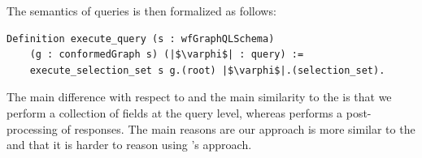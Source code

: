 The semantics of queries is then formalized as follows:
\begin{verbatim}
Definition execute_query (s : wfGraphQLSchema)
    (g : conformedGraph s) (|$\varphi$| : query) :=
    execute_selection_set s g.(root) |$\varphi$|.(selection_set).
\end{verbatim}



The main difference with respect to \HP and the main similarity to the \spec is that we perform a collection of fields at the query level, whereas \HP performs a post-processing of responses. The main reasons are our approach is more similar to the \spec and that it is harder to reason using \HP's approach.


